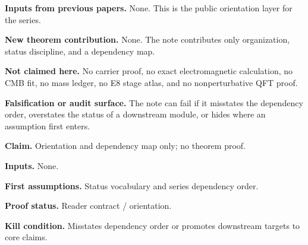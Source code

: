 
\maketitle

\begin{abstract}
This note is the thin entry document for the TFPT 4.5 series. It does not attempt to prove the
full theory. Its purpose is to state what TFPT claims, what it does not claim, how the closed branch
is organized, and where each load-bearing argument is isolated in the paper sequence.
\end{abstract}

\begin{tfptfrontbox}
\textbf{Inputs from previous papers.} None. This is the public orientation layer for the series.

\textbf{New theorem contribution.} None. The note contributes only organization, status discipline,
and a dependency map.

\textbf{Not claimed here.} No carrier proof, no exact electromagnetic calculation, no CMB fit, no
mass ledger, no E8 stage atlas, and no nonperturbative QFT proof.

\textbf{Falsification or audit surface.} The note can fail if it misstates the dependency order,
overstates the status of a downstream module, or hides where an assumption first enters.
\end{tfptfrontbox}


\begin{tfptclaimcontract}
\textbf{Claim.} Orientation and dependency map only; no theorem proof.\par
\textbf{Inputs.} None.\par
\textbf{First assumptions.} Status vocabulary and series dependency order.\par
\textbf{Proof status.} Reader contract / orientation.\par
\textbf{Kill condition.} Misstates dependency order or promotes downstream targets to core claims.\par
\end{tfptclaimcontract}

